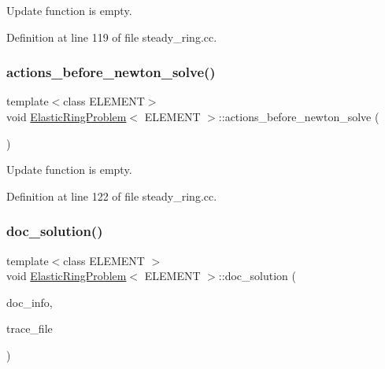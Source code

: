 Update function is empty. 



Definition at line 119 of file steady\+\_\+ring.\+cc.

\mbox{\label{classElasticRingProblem_a6d084ac04c73a116f5ece449935a31d3}} 
\subsubsection{\texorpdfstring{actions\+\_\+before\+\_\+newton\+\_\+solve()}{actions\_before\_newton\_solve()}}
{\footnotesize\ttfamily template$<$class E\+L\+E\+M\+E\+NT$>$ \\
void \hyperlink{classElasticRingProblem}{Elastic\+Ring\+Problem}$<$ E\+L\+E\+M\+E\+NT $>$\+::actions\+\_\+before\+\_\+newton\+\_\+solve (\begin{DoxyParamCaption}{ }\end{DoxyParamCaption})\hspace{0.3cm}{\ttfamily [inline]}}



Update function is empty. 



Definition at line 122 of file steady\+\_\+ring.\+cc.

\mbox{\label{classElasticRingProblem_ab644c5fd57310f2d4c858f64d8c5a223}} 
\subsubsection{\texorpdfstring{doc\+\_\+solution()}{doc\_solution()}}
{\footnotesize\ttfamily template$<$class E\+L\+E\+M\+E\+NT $>$ \\
void \hyperlink{classElasticRingProblem}{Elastic\+Ring\+Problem}$<$ E\+L\+E\+M\+E\+NT $>$\+::doc\+\_\+solution (\begin{DoxyParamCaption}\item[{Doc\+Info \&}]{doc\+\_\+info,  }\item[{ofstream \&}]{trace\+\_\+file }\end{DoxyParamCaption})}



